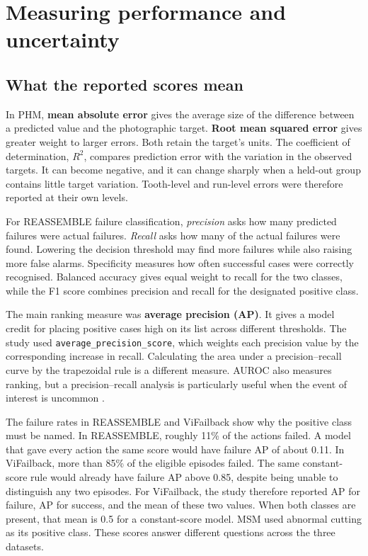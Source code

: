 \section{Measuring performance and uncertainty}
\label{sec:ch4-metrics}

\subsection{What the reported scores mean}

In PHM, \textbf{mean absolute error} gives the average size of the difference between a
predicted value and the photographic target. \textbf{Root mean squared error} gives
greater weight to larger errors. Both retain the target’s units. The coefficient of
determination, \(R^2\), compares prediction error with the variation in the observed
targets. It can become negative, and it can change sharply when a held-out group
contains little target variation. Tooth-level and run-level errors were therefore
reported at their own levels.

For REASSEMBLE failure classification, \emph{precision} asks how many predicted failures
were actual failures. \emph{Recall} asks how many of the actual failures were found.
Lowering the decision threshold may find more failures while also raising more false
alarms. Specificity measures how often successful cases were correctly recognised.
Balanced accuracy gives equal weight to recall for the two classes, while the F1 score
combines precision and recall for the designated positive class.

The main ranking measure was \textbf{average precision (AP)}. It gives a model credit
for placing positive cases high on its list across different thresholds. The study used
\texttt{average\_precision\_score}, which weights each precision value by the
corresponding increase in recall. Calculating the area under a precision–recall curve by
the trapezoidal rule is a different measure. AUROC also measures ranking, but a
precision–recall analysis is particularly useful when the event of interest is uncommon
\parencite{Saito2015PrecisionRecall}.

The failure rates in REASSEMBLE and ViFailback show why the positive class must be
named. In REASSEMBLE, roughly 11\% of the actions failed. A model that gave every action
the same score would have failure AP of about 0.11. In ViFailback, more than 85\% of the
eligible episodes failed. The same constant-score rule would already have failure AP
above 0.85, despite being unable to distinguish any two episodes. For ViFailback, the
study therefore reported AP for failure, AP for success, and the mean of these two
values. When both classes are present, that mean is 0.5 for a constant-score model. MSM
used abnormal cutting as its positive class. These scores answer different questions
across the three datasets.

